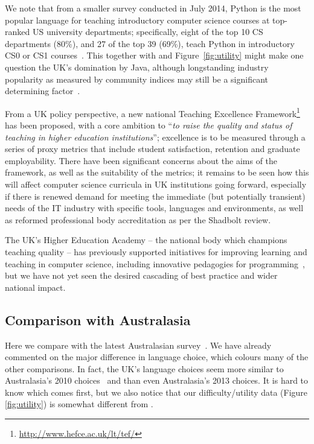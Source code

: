 \documentclass[a4paper,11pt]{article}
\begin{document}
We note that from a smaller survey conducted in July 2014, Python is
the most popular language for teaching introductory computer science
courses at top-ranked US university departments; specifically, eight
of the top 10 CS departments (80\%), and 27 of the top 39 (69\%),
teach Python in introductory CS0 or CS1 courses~\cite{guo:2014}.  This
together with \cite{mason+cooper:2014} and Figure~\ref{fig:utility}
might make one question the UK's domination by Java, although
longstanding industry popularity as measured by community indices may
still be a significant determining factor~\cite{tiobe:sep2016}.

From a UK policy perspective, a new national Teaching Excellence
Framework\footnote{\url{http://www.hefce.ac.uk/lt/tef/}} has been
proposed, with a core ambition to ``{\emph{to raise the quality and
status of teaching in higher education institutions}}''; excellence is
to be measured through a series of proxy metrics that include student
satisfaction, retention and graduate employability. There have been
significant concerns about the aims of the framework, as well as the
suitability of the metrics; it remains to be seen how this will affect
computer science curricula in UK institutions going forward,
especially if there is renewed demand for meeting the immediate (but
potentially transient) needs of the IT industry with specific tools,
languages and environments, as well as reformed professional body
accreditation as per the Shadbolt review.


The UK's Higher Education Academy -- the national body which champions
teaching quality -- has previously supported initiatives for improving
learning and teaching in computer science, including innovative
pedagogies for
programming~\cite{crick-et-al-hea:2015,davenport-et-al:latice2016},
but we have not yet seen the desired cascading of best practice and
wider national impact.

\subsection{Comparison with Australasia}

Here we compare with the latest Australasian
survey~\cite{mason+cooper:2014}. We have already commented on the
major difference in language choice, which colours many of the other
comparisons. In fact, the UK's language choices seem more similar to
Australasia's 2010 choices~\cite{mason-et-al:2012} and \cite[Table
4]{mason+cooper:2014} than even Australasia's 2013 choices. It is hard
to know which comes first, but we also notice that our
difficulty/utility data (Figure \ref{fig:utility}) is somewhat
different from \cite[Figures 7/8]{mason+cooper:2014}.
\end{document}
